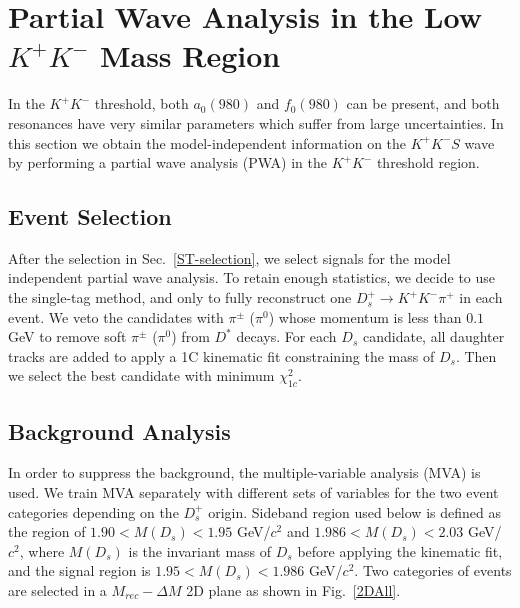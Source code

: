 \section{Partial Wave Analysis in the Low $K^{+}K^{-}$ Mass Region}
\label{MIPWA}
\par{In the $K^{+}K^{-}$ threshold, both $a_{0}(980)$ and $f_{0}(980)$ can be present, and both resonances have very similar parameters which suffer from large uncertainties. 
In this section we obtain the model-independent information on the $K^{+}K^{-} S$ wave by performing a partial wave analysis (PWA) in the  $K^{+}K^{-}$ threshold region.}
\subsection{Event Selection}
\label{MIPWASelection}
\par{
    After the selection in Sec.~\ref{ST-selection}, we select signals for the model independent partial wave analysis.
    To retain enough statistics, we decide to use the single-tag method, and only to fully reconstruct one $D_{s}^{+} \rightarrow K^{+}K^{-}\pi^{+}$ in each event. 
We veto the candidates with $\pi^{\pm}$ ($\pi^{0}$) whose momentum is less than $0.1$ GeV to remove soft $\pi^{\pm}$ ($\pi^{0}$) from $D^{*}$ decays.
For each $D_{s}$ candidate, all daughter tracks are added to apply a 1C kinematic fit constraining the mass of $D_{s}$. 
Then we select the best candidate with minimum $\chi_{1c}^{2}$.
}
\subsection{Background Analysis}
\label{MIPWA-BA}
In order to suppress the background, the multiple-variable analysis (MVA) is used. We train MVA separately with different sets of variables for the two event categories depending on the $D_{s}^{+}$ origin. 
Sideband region used below is defined as the region of $1.90 < M(D_{s}) < 1.95$ GeV/$c^{2}$ and   $1.986 < M(D_{s}) < 2.03$ GeV/$c^{2}$, where $M(D_{s})$ is the invariant mass of $D_{s}$ before applying the kinematic fit, and the signal region is $1.95 < M(D_{s}) < 1.986$ GeV/$c^{2}$.
Two categories of events are selected in a $M_{rec}-\Delta{M}$ 2D plane as shown in Fig.~\ref{2DAll}.





